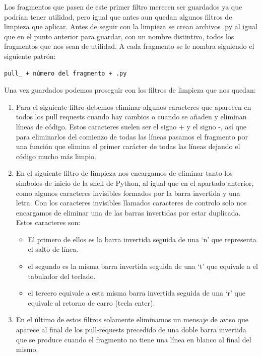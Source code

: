 \documentclass[a4paper, 12pt]{book}
\begin{document}
Los fragmentos que pasen de este primer filtro merecen ser guardados ya que podrían tener utilidad, pero igual que antes aun quedan algunos filtros de limpieza que aplicar. Antes de seguir con la limpieza se crean archivos .py al igual que en el punto anterior para guardar, con un nombre distintivo, todos los fragmentos que nos sean de utilidad. A cada fragmento se le nombra siguiendo el siguiente patrón:
 
\begin{verbatim}
pull_ + número del fragmento + .py
\end{verbatim}

Una vez guardados podemos proseguir con los filtros de limpieza que nos quedan:

\begin{enumerate}
	\item Para el siguiente filtro debemos eliminar algunos caracteres que aparecen en todos los pull requests cuando hay cambios o cuando se añaden y eliminan líneas de código. Estos caracteres suelen ser el signo + y el signo -, así que para eliminarlos del comienzo de todas las líneas pasamos el fragmento por una función que elimina el primer carácter de todas las líneas dejando el código mucho más limpio.
	\item En el siguiente filtro de limpieza nos encargamos de eliminar tanto los simbolos de inicio de la shell de Python, al igual que en el apartado anterior, como algunos caracteres invisibles formados por la barra invertida y una letra. Con los caracteres invisibles llamados caracteres de controlo solo nos encargamos de eliminar una de las barras invertidas por estar duplicada. Estos caracteres son:
	\begin{itemize}
		\item El primero de ellos es la barra invertida seguida de una `n' que representa el salto de línea.
		\item el segundo es la misma barra invertida seguida de una `t' que equivale a el tabulador del teclado.
		\item el tercero equivale a esta misma barra invertida seguida de una `r' que equivale al retorno de carro (tecla enter).
	\end{itemize}
	\item En el último de estos filtros solamente eliminamos un mensaje de aviso que aparece al final de los pull-requests precedido de una doble barra invertida que se produce cuando el fragmento no tiene una línea en blanco al final del mismo.
\end{enumerate}
\end{document}
